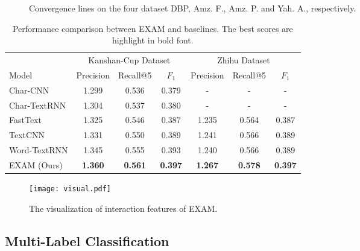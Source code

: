\documentclass[letterpaper]{article} \usepackage{aaai19}  \usepackage{times}  \usepackage{helvet}  \usepackage{courier}  \usepackage{url}  \usepackage{graphicx}
\begin{document}
\begin{figure*}[!htb]

\centering
{}
\caption{Convergence lines on the four dataset DBP, Amz. F., Amz. P. and Yah. A., respectively.}
\label{loss}
\end{figure*}
\begin{table*}
  \caption{Performance comparison between EXAM and baselines. The best scores are highlight in bold font.}
  \label{table}
  \centering
  \begin{tabular}{lcccccc}
    \toprule
     & \multicolumn{3}{c}{Kanshan-Cup Dataset} & \multicolumn{3}{c}{Zhihu Dataset} \\
    \cmidrule(r){2-4} \cmidrule(r){5-7}
    Model     &Precision & Recall@5 &$F_{1}$    &Precision & Recall@5 &$F_{1}$ \\
    \midrule
    Char-CNN \cite{charcnn} &1.299 & 0.536 &0.379  &- & - &-    \\
    Char-TextRNN \cite{TextRNN} &1.304 &0.537 &0.380  &- & - &-    \\
     \midrule
    FastText \cite{fasttext} &1.325 & 0.546 &0.387  &1.235 &0.564 &0.387 \\
    TextCNN \cite{TextCNN} &1.331 & 0.550 &0.389  &1.241 &0.566 &0.389    \\
    Word-TextRNN \cite{TextRNN} &1.345 & 0.555 &0.393  &1.240 &0.566  &0.389    \\
    EXAM (Ours) &\textbf{1.360} &\textbf{0.561} &\textbf{0.397} &\textbf{1.267}  &\textbf{0.578}  &\textbf{0.397}    \\
    \bottomrule
  \end{tabular}
\end{table*}
\begin{figure*}
\centering
\texttt{[image: visual.pdf]}
\caption{The visualization of interaction features of EXAM.}
\label{vis4text}
\end{figure*}
\subsection{Multi-Label Classification}
\end{document}
